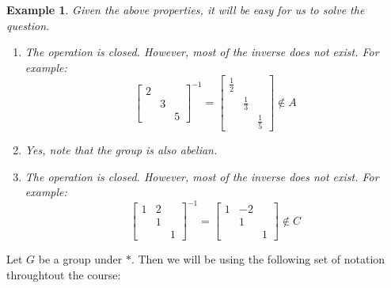 \documentclass{article}
\theoremstyle{MyNonumberplain}
\theoremstyle{break}
\theoremstyle{break}
\newtheorem{example}{Example}[section]
\theoremstyle{break}
\theoremstyle{definition}
\theoremstyle{break}
\begin{document}
\begin{expbox}
\begin{example}
        Given the above properties, it will be easy for us to solve the question.\bigskip

        \begin{ansbox}
            \begin{enumerate}
                \item The operation is closed. However, most of the inverse does not exist. For
                example:
                \[ \left[\begin{array}{ccc}
                    2 &  & \\
                    & 3 & \\
                    &  & 5
                \end{array}\right]^{- 1} = \left[\begin{array}{ccc}
                    \frac{1}{2} &  & \\
                    & \frac{1}{3} & \\
                    &  & \frac{1}{5}
                \end{array}\right] \not\in A \]\bigskip
        
                \item Yes, note that the group is also abelian.\bigskip
                \item The operation is closed. However, most of the inverse does not exist. For
                example:
                \[ \left[\begin{array}{ccc}
                    1 & 2 & \\
                    & 1 & \\
                    &  & 1
                \end{array}\right]^{- 1} = \left[\begin{array}{ccc}
                    1 & - 2 & \\
                    & 1 & \\
                    &  & 1
                \end{array}\right] \not\in C \]
            \end{enumerate}
    
        \end{ansbox}
    \end{example}
\end{expbox}

\newpage 

Let $G$ be a group under $*$. Then we will be using the following set of notation throughtout the course:
\end{document}
